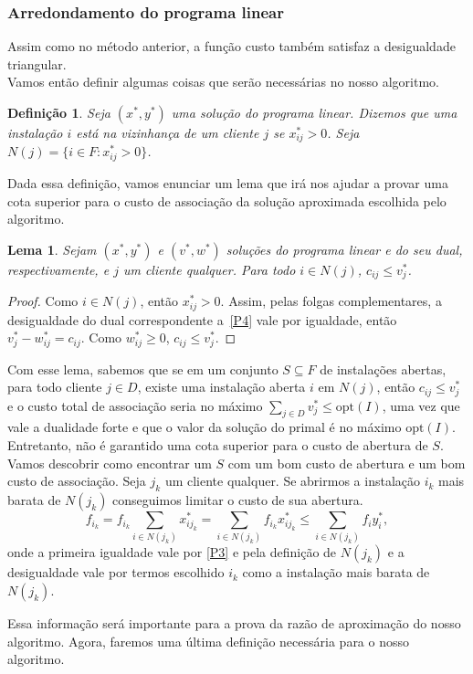 \documentclass[12pt]{article}
\newcommand{\opt}{\ensuremath{\mathrm{opt}}}
\newtheorem{lemma}[theorem]{Lema}
\newtheorem{definition}[theorem]{Definição}
\begin{document}
\subsubsection{Arredondamento do programa linear}
Assim como no método anterior, a função custo também satisfaz a desigualdade triangular. \\
Vamos então definir algumas coisas que serão necessárias no nosso algoritmo.
\begin{definition}
    Seja $(x^*,y^*)$ uma solução do programa linear. Dizemos que uma instalação $i$ está na \emph{vizinhança} de um cliente $j$ se $x^*_{ij} > 0$. Seja $N(j) = \{ i \in F : x^*_{ij} > 0\}$.
\end{definition}
Dada essa definição, vamos enunciar um lema que irá nos ajudar a provar uma cota superior para o custo de associação da solução aproximada escolhida pelo algoritmo.
\begin{lemma}\label{lemma:3.5}
    Sejam $(x^*,y^*)$ e $(v^*,w^*)$ soluções do programa linear e do seu dual, respectivamente, e $j$ um cliente qualquer. Para todo $i \in N(j)$, $c_{ij} \leq v^*_j$.
\end{lemma}
\begin{proof}
    Como $i \in N(j)$, então $x^*_{ij}>0$. Assim, pelas folgas complementares, a desigualdade do dual correspondente a~\eqref{P4} vale por igualdade, então $v^*_j - w^*_{ij} = c_{ij}$. Como $w^*_{ij} \geq 0$, $c_{ij} \leq v^*_j$. 
\end{proof}
Com esse lema, sabemos que se em um conjunto $S \subseteq F$ de instalações abertas, para todo cliente $j \in D$, existe uma instalação aberta $i$ em $N(j)$, então $c_{ij}\leq v_j^*$ e o custo total de associação seria no máximo $\sum_{j\in D}v_j^* \leq \opt(I)$, uma vez que vale a dualidade forte e que o valor da solução do primal é no máximo $\opt(I)$. Entretanto, não é garantido uma cota superior para o custo de abertura de $S$. Vamos descobrir como encontrar um $S$ com um bom custo de abertura e um bom custo de associação. Seja $j_k$ um cliente qualquer. Se abrirmos a instalação $i_k$ mais barata de $N(j_k)$ conseguimos limitar o custo de sua abertura.
\[\tag{*} \label{relx_fl:*}
    f_{i_k} = f_{i_k} \sum_{i \in N(j_k)}x^*_{ij_k} = \sum_{i \in N(j_k)}f_{i_k}x^*_{ij_k} \leq \sum_{i \in N(j_k)}f_{i}y^*_{i},
\]
onde a primeira igualdade vale por \eqref{P3} e pela definição de $N(j_k)$ e a desigualdade vale por termos escolhido $i_k$ como a instalação mais barata de $N(j_k)$.

Essa informação será importante para a prova da razão de aproximação do nosso algoritmo. Agora, faremos uma última definição necessária para o nosso algoritmo.
\end{document}
